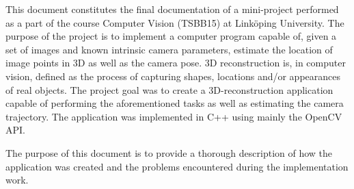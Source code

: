This document constitutes the final documentation of a mini-project performed as a part of the course Computer Vision (TSBB15) at Linköping University. The purpose of the project is to implement a computer program capable of, given a set of images and known intrinsic camera parameters, estimate the location of image points in 3D as well as the camera pose. 3D reconstruction is, in computer vision, defined as the process of capturing shapes, locations and/or appearances of real objects. The project goal was to create a 3D-reconstruction application capable of performing the aforementioned tasks as well as estimating the camera trajectory. The application was implemented in C++ using mainly the OpenCV API.

The purpose of this document is to provide a thorough description of how the application was created and the problems encountered during the implementation work.
